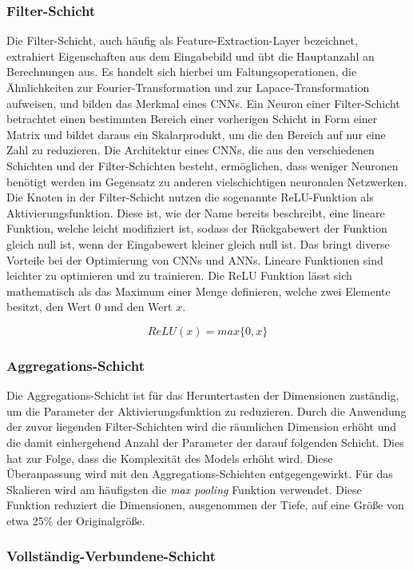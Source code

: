 \subsubsection{Filter-Schicht}
Die Filter-Schicht, auch häufig als Feature-Extraction-Layer bezeichnet, extrahiert Eigenschaften aus dem Eingabebild und übt die Hauptanzahl an Berechnungen aus.
Es handelt sich hierbei um Faltungsoperationen, die Ähnlichkeiten zur Fourier-Transformation und zur Lapace-Transformation aufweisen, und bilden das Merkmal eines CNNs.
Ein Neuron einer Filter-Schicht betrachtet einen bestimmten Bereich einer vorherigen Schicht in Form einer Matrix und bildet daraus ein Skalarprodukt, um die den Bereich auf nur eine Zahl zu reduzieren.
Die Architektur eines CNNs, die aus den verschiedenen Schichten und der Filter-Schichten besteht, ermöglichen, dass weniger Neuronen benötigt werden im Gegensatz zu anderen vielschichtigen neuronalen Netzwerken.\cite*{Sewak2018}
Die Knoten in der Filter-Schicht nutzen die sogenannte \ac{ReLU}-Funktion als Aktivierungsfunktion. Diese ist, wie der Name bereits beschreibt, eine lineare Funktion, welche leicht modifiziert ist, sodass der Rückgabewert der Funktion gleich null ist, wenn der Eingabewert kleiner gleich null ist. Das bringt diverse Vorteile bei der Optimierung von CNNs und ANNs. Lineare Funktionen sind leichter zu optimieren und zu trainieren. Die ReLU Funktion lässt sich mathematisch als das Maximum einer Menge definieren, welche zwei Elemente besitzt, den Wert $0$ und den Wert $x$.

\[ReLU(x) = max\{0, x\}\] \cite*{goodfellow2016}

\subsubsection{Aggregations-Schicht}
Die Aggregations-Schicht ist für das Heruntertasten der Dimensionen zuständig, um die Parameter der Aktivierungsfunktion zu reduzieren. Durch die Anwendung der zuvor liegenden Filter-Schichten wird die räumlichen Dimension erhöht und die damit einhergehend Anzahl der Parameter der darauf folgenden Schicht. Dies hat zur Folge, dass die Komplexität des Models erhöht wird. Diese Überanpassung wird mit den Aggregations-Schichten entgegengewirkt.\cite*{Sewak2018}
Für das Skalieren wird am häufigsten die \textit{max pooling} Funktion verwendet. Diese Funktion reduziert die Dimensionen, ausgenommen der Tiefe, auf eine Größe von etwa 25\% der Originalgröße.\cite*{Keiron2015}

\subsubsection{Vollständig-Verbundene-Schicht}

